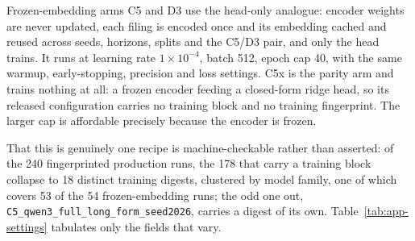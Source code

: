 Frozen-embedding arms C5 and D3 use the head-only analogue: encoder weights
are never updated, each filing is encoded once and its embedding cached and
reused across seeds, horizons, splits and the C5/D3 pair, and only the head
trains. It runs at learning rate $1\times10^{-4}$, batch 512, epoch cap 40,
with the same warmup, early-stopping, precision and loss settings. C5x is the
parity arm and
trains nothing at all: a frozen encoder feeding a closed-form ridge head, so its
released configuration carries no training block and no training fingerprint. %
The larger cap is affordable precisely because the encoder is frozen.

That this is genuinely one recipe is machine-checkable rather than asserted: of
the 240 fingerprinted production runs, the 178 that carry a training block
collapse to 18 distinct training digests, clustered by model family, one of which
covers 53 of the 54 frozen-embedding runs; the odd one out,
\texttt{C5\_qwen3\_full\_long\_form\_seed2026}, carries a digest of its own. %
Table~\ref{tab:app-settings} tabulates only the fields that vary.

